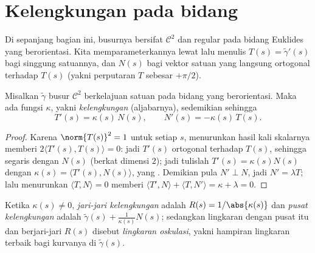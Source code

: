 \section{Kelengkungan pada bidang}

Di sepanjang bagian ini, busurnya bersifat $\mathcal{C}^2$ dan regular pada
bidang Euklides yang berorientasi. Kita memparameterkannya lewat  lalu
menulis $T(s) = \tilde\gamma'(s)$ bagi singgung satuannya, dan $N(s)$
bagi vektor satuan yang langsung ortogonal terhadap $T(s)$ (yakni perputaran
$T$ sebesar $+\pi/2$).

\begin{theorem}\label{thm:b2:curves:frenet2d}
Misalkan $\tilde\gamma$ busur $\mathcal{C}^2$ berkelajuan satuan pada
bidang yang berorientasi. Maka ada fungsi  $\kappa$, yakni
\emph{kelengkungan} (aljabarnya), sedemikian sehingga
\[
T'(s) = \kappa(s)\, N(s),
\qquad
N'(s) = -\kappa(s)\, T(s).
\]
\end{theorem}

\begin{proof}
Karena $\norm{T(s)}^2 = 1$ untuk setiap $s$, menurunkan hasil kali
skalarnya memberi $2\langle T'(s), T(s)\rangle = 0$: jadi $T'(s)$ ortogonal terhadap
$T(s)$, sehingga segaris dengan $N(s)$ (berkat dimensi $2$); jadi tulislah $T'(s)
= \kappa(s) N(s)$ dengan $\kappa(s) = \langle T'(s), N(s)\rangle$,
yang . Demikian pula $N' \perp N$, jadi $N' = \lambda T$; lalu
menurunkan $\langle T, N\rangle = 0$ memberi $\langle T', N\rangle +
\langle T, N'\rangle = \kappa + \lambda = 0$.
\end{proof}

\begin{definition}\label{def:b2:curves:curvature}
Ketika $\kappa(s) \neq 0$, \emph{jari-jari
kelengkungan} adalah $R(s) =
1/\abs{\kappa(s)}$ dan \emph{pusat kelengkungan} adalah
$\tilde\gamma(s) + \frac{1}{\kappa(s)} N(s)$; sedangkan lingkaran dengan pusat
itu dan berjari-jari $R(s)$ disebut \emph{lingkaran oskulasi}, yakni
hampiran lingkaran terbaik bagi kurvanya di $\tilde\gamma(s)$.
\end{definition}


